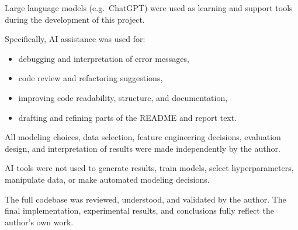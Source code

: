 \documentclass[11pt,a4paper]{article}
\begin{document}
Large language models (e.g.\ ChatGPT) were used as learning and support tools during the development of this project.

Specifically, AI assistance was used for:
\begin{itemize}
    \item debugging and interpretation of error messages,
    \item code review and refactoring suggestions,
    \item improving code readability, structure, and documentation,
    \item drafting and refining parts of the README and report text.
\end{itemize}

All modeling choices, data selection, feature engineering decisions, evaluation design, and interpretation of results were made independently by the author.

AI tools were not used to generate results, train models, select hyperparameters, manipulate data, or make automated modeling decisions.

The full codebase was reviewed, understood, and validated by the author. The final implementation, experimental results, and conclusions fully reflect the author’s own work.

\newpage
\printbibliography
\end{document}
